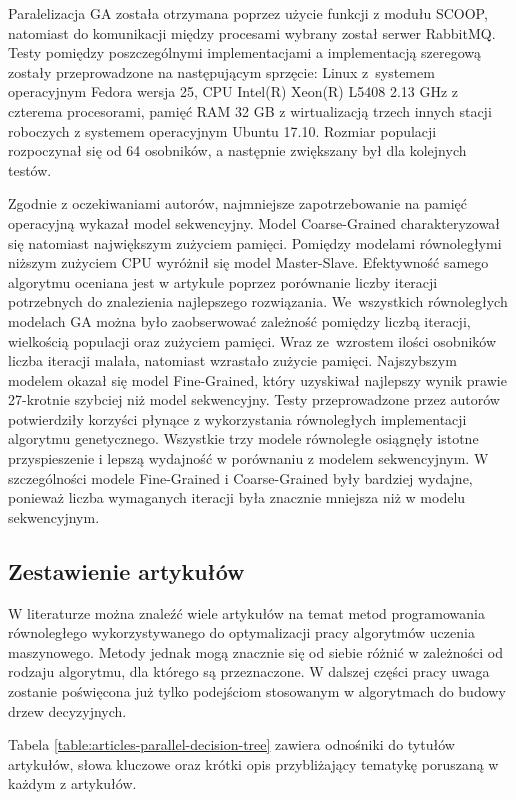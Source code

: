 \documentclass[12pt]{article}
\begin{document}
Paralelizacja GA została otrzymana poprzez użycie funkcji z modułu SCOOP, natomiast do komunikacji między procesami wybrany został serwer RabbitMQ. Testy pomiędzy poszczególnymi
implementacjami a implementacją szeregową zostały przeprowadzone na następującym sprzęcie: Linux z~systemem operacyjnym Fedora wersja 25, CPU Intel(R) Xeon(R) L5408
2.13 GHz z czterema procesorami, pamięć RAM 32 GB z wirtualizacją trzech innych stacji roboczych z systemem operacyjnym Ubuntu 17.10. Rozmiar populacji rozpoczynał się od
64 osobników, a następnie zwiększany był dla kolejnych testów.

Zgodnie z oczekiwaniami autorów, najmniejsze zapotrzebowanie na pamięć operacyjną wykazał model sekwencyjny. Model Coarse-Grained charakteryzował się natomiast największym
zużyciem pamięci. Pomiędzy modelami równoległymi niższym zużyciem CPU wyróżnił się model Master-Slave. Efektywność samego algorytmu oceniana jest w artykule poprzez porównanie
liczby iteracji potrzebnych do znalezienia najlepszego rozwiązania. We~wszystkich równoległych modelach GA można było zaobserwować zależność pomiędzy liczbą iteracji, wielkością
populacji oraz zużyciem pamięci. Wraz ze~wzrostem ilości osobników liczba iteracji malała, natomiast wzrastało zużycie pamięci. Najszybszym modelem okazał się model Fine-Grained,
który uzyskiwał najlepszy wynik prawie 27-krotnie szybciej niż model sekwencyjny. Testy przeprowadzone przez autorów potwierdziły korzyści płynące z wykorzystania równoległych
implementacji algorytmu genetycznego. Wszystkie trzy modele równoległe osiągnęły istotne przyspieszenie i lepszą wydajność w porównaniu z modelem sekwencyjnym. W szczególności
modele Fine-Grained i Coarse-Grained były bardziej wydajne, ponieważ liczba wymaganych iteracji była znacznie mniejsza niż w modelu sekwencyjnym.

\subsection{Zestawienie artykułów}

W literaturze można znaleźć wiele artykułów na temat metod programowania równoległego wykorzystywanego do optymalizacji pracy algorytmów uczenia maszynowego. 
Metody jednak mogą znacznie się od siebie różnić w zależności od rodzaju algorytmu, dla którego są przeznaczone. W dalszej części pracy uwaga zostanie poświęcona
już tylko podejściom stosowanym w algorytmach do budowy drzew decyzyjnych.

Tabela \ref{table:articles-parallel-decision-tree} zawiera odnośniki do tytułów artykułów, słowa kluczowe oraz krótki opis przybliżający tematykę poruszaną w każdym z artykułów.
\end{document}
